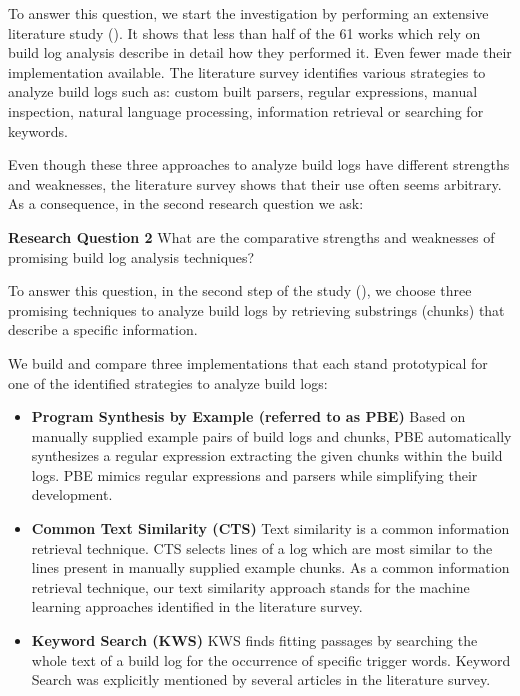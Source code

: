 To answer this question, we start the investigation by performing an
extensive literature study ().
It shows that
less than half of the 61 works which rely on build log analysis
describe in detail how they performed it.
Even fewer
made their implementation available.
The literature
survey identifies various strategies to
analyze build logs such as:
custom built parsers, regular expressions, manual inspection,
natural language processing, information retrieval or searching
for keywords.

Even though these three approaches to analyze
build logs have different strengths and weaknesses, the literature
survey shows that their use often seems arbitrary.
As a consequence,
in the second research question we ask:

\begin{simplebox}[minipage boxed title*=-5cm]{\textbf{Research Question
2}}
What are the comparative strengths and weaknesses
of promising build log analysis techniques?
\end{simplebox}

To answer this question, in the second step of the study
(), we choose three promising
techniques to analyze build logs by retrieving substrings
(chunks) that describe a specific information.

We build and compare three
implementations that each stand prototypical for one of the identified
strategies to analyze build logs:

\begin{itemize}
  \item \textbf{Program Synthesis by Example (referred to as PBE)}
  Based on manually supplied example pairs of build logs and chunks,
  PBE automatically synthesizes
  a regular expression extracting the given chunks within the build logs.
  PBE mimics regular expressions and parsers while
  simplifying their development.
  \item \textbf{Common Text Similarity (CTS)}
  Text similarity is a common information retrieval technique.
  CTS selects lines of a log which are
  most similar to the lines present in manually supplied example chunks.
  As a common information retrieval technique, our text similarity
  approach stands for the machine learning approaches identified in
  the literature survey.
  \item \textbf{Keyword Search (KWS)}
  KWS finds fitting passages by searching the whole
  text of a build log for
  the occurrence of specific trigger words.
  Keyword Search was explicitly mentioned by several articles in the
  literature survey.
\end{itemize}

